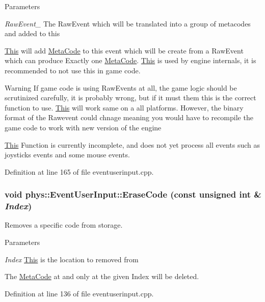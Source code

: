\begin{DoxyParams}{Parameters}
\item[{\em RawEvent\_\-}]The RawEvent which will be translated into a group of metacodes and added to this\end{DoxyParams}
\hyperlink{structThis}{This} will add \hyperlink{classphys_1_1MetaCode}{MetaCode} to this event which will be create from a RawEvent which can produce Exactly one \hyperlink{classphys_1_1MetaCode}{MetaCode}. \hyperlink{structThis}{This} is used by engine internals, it is recommended to not use this in game code. \begin{DoxyWarning}{Warning}
If game code is using RawEvents at all, the game logic should be scrutinized carefully, it is probably wrong, but if it must them this is the correct function to use. \hyperlink{structThis}{This} will work same on a all platforms. However, the binary format of the Rawevent could chnage meaning you would have to recompile the game code to work with new version of the engine \par
 \hyperlink{structThis}{This} Function is currently incomplete, and does not yet process all events such as joysticks events and some mouse events. 
\end{DoxyWarning}


Definition at line 165 of file eventuserinput.cpp.

\hypertarget{classphys_1_1EventUserInput_a583084578443019d6e286b8f0e02ce58}{
\subsubsection[{EraseCode}]{\setlength{\rightskip}{0pt plus 5cm}void phys::EventUserInput::EraseCode (const unsigned int \& {\em Index})}}
\label{d7/df5/classphys_1_1EventUserInput_a583084578443019d6e286b8f0e02ce58}


Removes a specific code from storage. 


\begin{DoxyParams}{Parameters}
\item[{\em Index}]\hyperlink{structThis}{This} is the location to removed from\end{DoxyParams}
The \hyperlink{classphys_1_1MetaCode}{MetaCode} at and only at the given Index will be deleted. 

Definition at line 136 of file eventuserinput.cpp.

